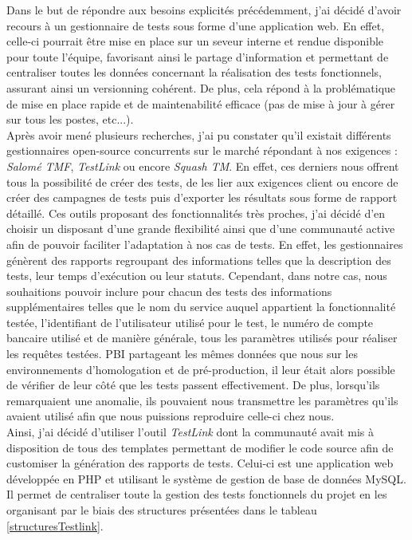 	Dans le but de répondre aux besoins explicités précédemment, j'ai décidé d'avoir recours à un gestionnaire de tests sous forme d'une application web. En effet, celle-ci pourrait être mise en place sur un seveur interne et rendue disponible pour toute l'équipe, favorisant ainsi le partage d'information et permettant de centraliser toutes les données concernant la réalisation des tests fonctionnels, assurant ainsi un versionning cohérent. De plus, cela répond à la problématique de mise en place rapide et de maintenabilité efficace (pas de mise à jour à gérer sur tous les postes, etc...). \\
	
	Après avoir mené plusieurs recherches, j'ai pu constater qu'il existait différents gestionnaires open-source concurrents sur le marché répondant à nos exigences : \textit{Salomé TMF}, \textit{TestLink} ou encore \textit{Squash TM}. En effet, ces derniers nous offrent tous la possibilité de créer des tests, de les lier aux exigences client ou encore de créer des campagnes de tests puis d'exporter les résultats sous forme de rapport détaillé. Ces outils proposant des fonctionnalités très proches, j'ai décidé d'en choisir un disposant d'une grande flexibilité ainsi que d'une communauté active afin de pouvoir faciliter l'adaptation à nos cas de tests. En effet, les gestionnaires génèrent des rapports regroupant des informations telles que la description des tests, leur temps d'exécution ou leur statuts. Cependant, dans notre cas, nous souhaitions pouvoir inclure pour chacun des tests des informations supplémentaires telles que le nom du service auquel appartient la fonctionnalité testée, l'identifiant de l'utilisateur utilisé pour le test, le numéro de compte bancaire utilisé et de manière générale, tous les paramètres utilisés pour réaliser les requêtes testées. PBI partageant les mêmes données que nous sur les environnements d'homologation et de pré-production, il leur était alors possible de vérifier de leur côté que les tests passent effectivement. De plus, lorsqu'ils remarquaient une anomalie, ils pouvaient nous transmettre les paramètres qu'ils avaient utilisé afin que nous puissions reproduire celle-ci chez nous. \\
	
	Ainsi, j'ai décidé d'utiliser l'outil \textit{TestLink} \cite{bib_testlink} dont la communauté avait mis à disposition de tous des templates permettant de modifier le code source afin de customiser la génération des rapports de tests. Celui-ci est une application web développée en PHP et utilisant le système de gestion de base de données MySQL. Il permet de centraliser toute la gestion des tests fonctionnels du projet en les organisant par le biais des structures présentées dans le tableau \ref{structuresTestlink}.
	

